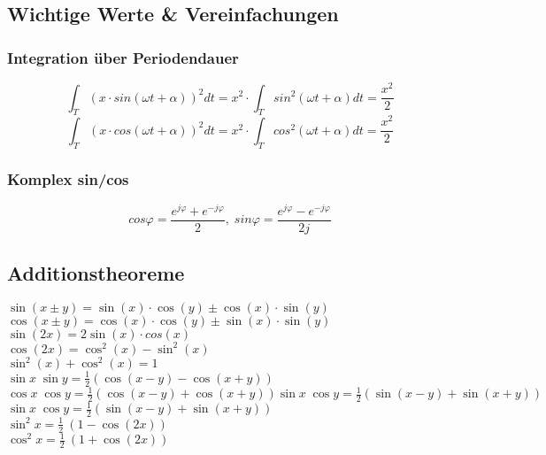 
\subsection{Wichtige Werte \& Vereinfachungen}

\subsubsection*{Integration über Periodendauer}
$$\int_T (x \cdot sin(\omega t + \alpha))^2 dt = x^2 \cdot \int_T sin^2(\omega t +\alpha) dt = \frac{x^2}{2}$$
$$\int_T (x \cdot cos(\omega t+\alpha))^2 dt = x^2 \cdot \int_T cos^2(\omega t+\alpha) dt = \frac{x^2}{2}$$


\subsubsection*{Komplex sin/cos}

$$cos \varphi = \frac{e^{j\varphi}+ e^{-j\varphi}}{2}, \; sin \varphi = \frac{e^{j\varphi} - e^{-j\varphi}}{2j} $$

\subsection*{Additionstheoreme}
\begin{multicols}{2}%
$\sin(x\pm y) = \sin(x) \cdot \cos(y) \pm \cos(x) \cdot \sin(y)$
\\$\cos(x \pm y)= \cos(x) \cdot \cos(y) \pm \sin(x) \cdot \sin(y)$
\\$\sin(2x) = 2 \sin(x) \cdot cos(x)$
\\$\cos(2x) = \cos^2(x)-\sin^2(x)$
\\$\sin^2(x) + \cos^2(x) = 1 $
\\$\sin x \; \sin y = \frac{1}{2}(\cos (x-y) - \cos (x+y))$
\\$\cos x \; \cos y = \frac{1}{2}(\cos (x-y) + \cos (x+y)) \sin x\;\cos y={\frac {1}{2}}(\sin(x-y)+\sin(x+y))$
\\$\sin x \; \cos y = \frac{1}{2}(\sin (x-y) + \sin (x+y))$
\\$\sin^2 x = \frac{1}{2}\ (1 - \cos (2x)) $
\\$\cos^2 x = \frac{1}{2}\ (1 + \cos (2x)) $
\end{multicols}

